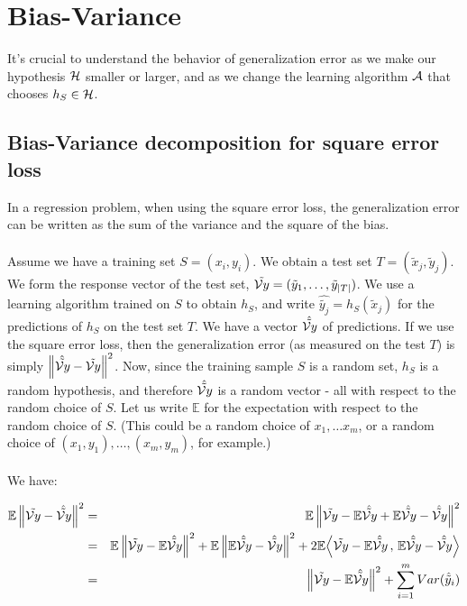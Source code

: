 \section{Bias-Variance}

It's crucial to understand the behavior of generalization error as we make our
hypothesis $\mathcal{H}$ smaller or larger, and as we change the learning algorithm
$\mathcal{A}$ that chooses $h_S\in\mathcal{H}$. 


\subsection{Bias-Variance decomposition for square error loss}

In a regression problem, when using the square error loss, the generalization
error can be written as the sum of the variance and the square of the bias. 
\\~\\
Assume we have a training set $S={(x_i,y_i)}$. 
       We obtain a test set $T=(\tilde{x}_j,\tilde{y}_j)$. 
       We form the response vector of the test set,
       $\tilde{\mathcal{V}{y}}=(\tilde{y}_1,\ldots,\tilde{y}_{|T|})$.
      We use a learning algorithm trained on $S$ to obtain $h_S$, 
      and write $\hat{\tilde{y_j}}=h_S(\tilde{x}_j)$  for the predictions
      of $h_S$ on the test set $T$. We have a vector $\hat{\tilde{\mathcal{V}{y}}}$ of
      predictions. If we use the square error loss, then the 
      generalization error (as measured  on the test $T$) is simply
    $\left\| \hat{\tilde{\mathcal{V}{y}}}-\tilde{\mathcal{V}{y}}\right\|^2$. 
      Now, since the training sample $S$ is a random set, $h_S$ is a random
      hypothesis, and
      therefore $\hat{\tilde{\mathcal{V}{y}}}$ is a random vector - all with respect to
      the random choice of $S$. 
      Let us  write $\mathbb{E}$ for the expectation with respect to the random
      choice of $S$. (This could be a random choice of $x_1,\ldots x_m$, or
    a random choice of $(x_1,y_1),\ldots,(x_m,y_m)$, for example.) 
\\~\\
      We have:


       \begin{eqnarray*}
         \mathbb{E} \left\| \tilde{\mathcal{V}{y}}-\hat{\tilde{\mathcal{V}{y}}}\right\|^2 &=& 
         \mathbb{E} \left\| \tilde{\mathcal{V}{y}}-\mathbb{E}\hat{\tilde{\mathcal{V}{y}}} + \mathbb{E} \hat{\tilde{\mathcal{V}{y}}} -
         \hat{\tilde{\mathcal{V}{y}}}\right\|^2 \\
         &=&  
         \mathbb{E} \left\| \tilde{\mathcal{V}{y}}-\mathbb{E}\hat{\tilde{\mathcal{V}{y}}} \right\|^2
         +
         \mathbb{E} \left\|  \mathbb{E} \hat{\tilde{\mathcal{V}{y}}} -
         \hat{\tilde{\mathcal{V}{y}}}\right\|^2
         + 2 \mathbb{E} {\left\langle  
           \tilde{\mathcal{V}{y}}-\mathbb{E}\hat{\tilde{\mathcal{V}{y}}} 
         \,,\,
           \mathbb{E} \hat{\tilde{\mathcal{V}{y}}} -
         \hat{\tilde{\mathcal{V}{y}}}
          \right\rangle}\\
&=& 
    \left\| \tilde{\mathcal{V}{y}}-\mathbb{E}\hat{\tilde{\mathcal{V}{y}}} \right\|^2
         +
         \sum_{i=1}^m Var(\hat{\tilde{y}}_i)
       \end{eqnarray*}


